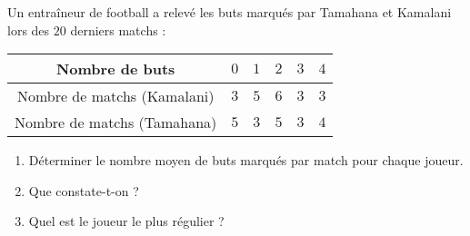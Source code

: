 \documentclass[a4paper,dvipsnames]{article}
\begin{document}
\exo[4 points] Un entraîneur de football a relevé les buts marqués par Tamahana et Kamalani lors des $20$ derniers matchs :

\begin{center}
  \begin{tabular}{@{}cccccc@{}}
    \toprule
    Nombre de buts & $0$ & $1$ & $2$ & $3$ & $4$ \\
    \midrule
    Nombre de matchs (Kamalani) & $3$ & $5$ & $6$ & $3$ & $3$\\
    Nombre de matchs (Tamahana) & $5$ & $3$ & $5$ & $3$ & $4$\\
    \bottomrule
  \end{tabular}
\end{center}

\begin{enumerate}
  \item Déterminer le nombre moyen de buts marqués par match pour chaque joueur.
  \item Que constate-t-on ?
  \item Quel est le joueur le plus régulier ?
\end{enumerate}
\end{document}
